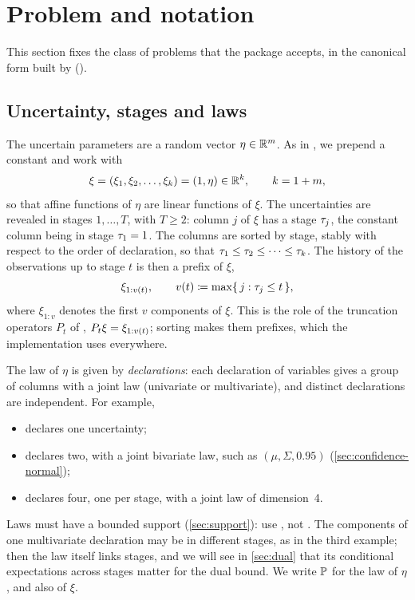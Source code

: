 \section{Problem and notation}
\label{sec:problem}

This section fixes the class of problems that the package accepts,
in the canonical form built by  ().

\subsection{Uncertainty, stages and laws}

The uncertain parameters are a random vector $\eta \in \mathbb{R}^m$.
As in \citet{KWG2011}, we prepend a constant and work with
\[
\xi = (\xi_1, \xi_2, \dots, \xi_k) = (1, \eta) \in \mathbb{R}^k, \qquad k = 1 + m,
\]
so that affine functions of $\eta$ are linear functions of $\xi$.
The uncertainties are revealed in stages $1, \dots, T$, with $T \ge 2$:
column $j$ of $\xi$ has a stage $\tau_j$, the constant column being in stage $\tau_1 = 1$.
The columns are sorted by stage, stably with respect to the order of declaration,
so that $\tau_1 \le \tau_2 \le \dots \le \tau_k$.
The history of the observations up to stage $t$ is then a prefix of $\xi$,
\[
\xi_{1:v(t)}, \qquad v(t) \coloneqq \max\{\, j : \tau_j \le t \,\},
\]
where $\xi_{1:v}$ denotes the first $v$ components of $\xi$.
This is the role of the truncation operators $P_t$ of \citet[Section~4]{KWG2011}, $P_t\xi = \xi_{1:v(t)}$;
sorting makes them prefixes, which the implementation uses everywhere.

The law of $\eta$ is given by \emph{declarations}:
each declaration of variables 
gives a group of columns with a joint law (univariate or multivariate),
and distinct declarations are independent.
For example,
\begin{itemize}[nosep]
\item {} declares one uncertainty;
\item {} declares two, with a joint bivariate law,
such as $(\mu, \Sigma, 0.95)$ (\cref{sec:confidence-normal});
\item {} declares four, one per stage, with a joint law of dimension~4.
\end{itemize}
Laws must have a bounded support (\cref{sec:support}): use , not .
The components of one multivariate declaration may be in different stages, as in the third example;
then the law itself links stages, and we will see in \cref{sec:dual} that its conditional expectations across stages matter for the dual bound.
We write $\mathbb{P}$ for the law of $\eta$, and also of $\xi$.

